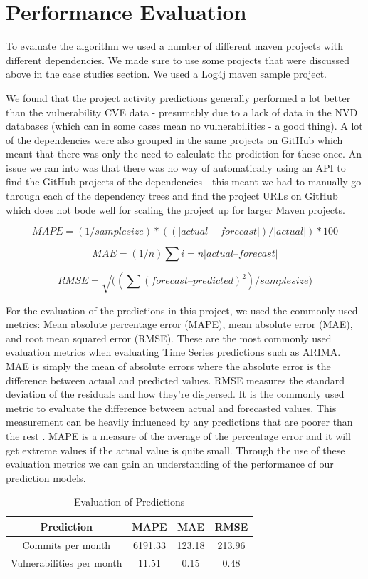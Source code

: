 \documentclass[conference]{IEEEtran}
\begin{document}
\section{Performance Evaluation}

To evaluate the algorithm we used a number of different maven projects with different dependencies. We made sure to use some projects that were discussed above in the case studies section. We used a Log4j maven sample project. 

We found that the project activity predictions generally performed a lot better than the vulnerability CVE data - presumably due to a lack of data in the NVD databases (which can in some cases mean no vulnerabilities - a good thing). A lot of the dependencies were also grouped in the same projects on GitHub which meant that there was only the need to calculate the prediction for these once. An issue we ran into was that there was no way of automatically using an API to find the GitHub projects of the dependencies - this meant we had to manually go through each of the dependency trees and find the project URLs on GitHub which does not bode well for scaling the project up for larger Maven projects. 

\[ MAPE = (1 / sample size) * ( ( |actual - forecast| ) / |actual| ) * 100 \]

\[ MAE = (1/n) \sum{i=n} |actual – forecast|  \]

\[ RMSE = \sqrt( (\sum (forecast – predicted) ^ 2) / sample size )  \]

For the evaluation of the predictions in this project, we used the commonly used metrics: Mean absolute percentage error (MAPE), mean absolute error (MAE), and root mean squared error (RMSE). These are the most commonly used evaluation metrics when evaluating Time Series predictions such as ARIMA. MAE is simply the mean of absolute errors where the absolute error is the difference between actual and predicted values. RMSE measures the standard deviation of the residuals and how they're dispersed. It is the commonly used metric to evaluate the difference between actual and forecasted values. This measurement can be heavily influenced by any predictions that are poorer than the rest \cite{f_abdulhafidh_dael_performance_2022}. MAPE is a measure of the average of the percentage error and it will get extreme values if the actual value is quite small. Through the use of these evaluation metrics we can gain an understanding of the performance of our prediction models. 

\begin{table}[H]
 \caption{Evaluation of Predictions}
\label{evaluations}
\begin{center}
\begin{tabular}{|c|c|c|c|}
\hline
    \textbf{Prediction} & \textbf{MAPE} & \textbf{MAE} & \textbf{RMSE} \\ \hline
    Commits per month & 6191.33 & 123.18 & 213.96 \\ \hline
    Vulnerabilities per month & 11.51 & 0.15 & 0.48 \\ \hline
\end{tabular}
\end{center}
\end{table}
\end{document}
